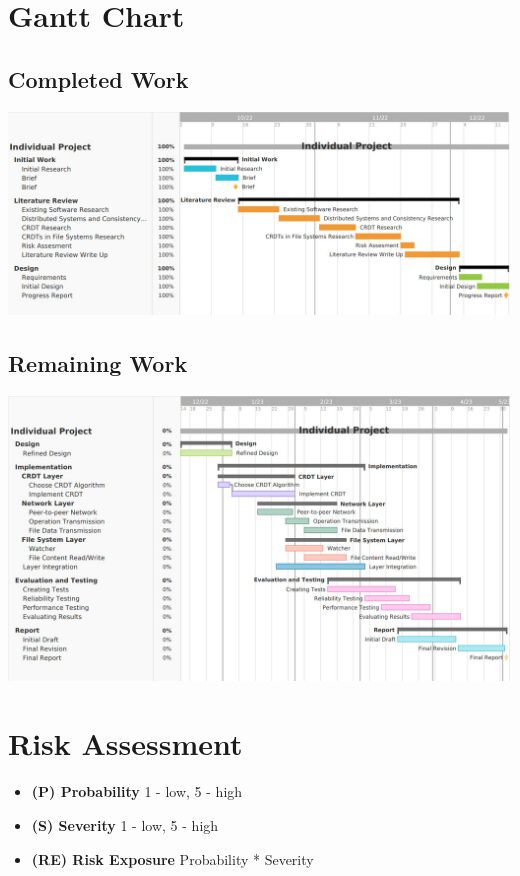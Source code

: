 \documentclass[12pt]{report}
\begin{document}
\section{Gantt Chart}

\subsection{Completed Work}
\includegraphics[width=16cm]{images/completed.jpg}


\subsection{Remaining Work}
\begin{center}
    \includegraphics[width=16cm]{images/remaining.jpg}
\end{center} 


\section{Risk Assessment}

\begin{itemize}
    \item \textbf{(P) Probability} 1 - low, 5 - high
    \item \textbf{(S) Severity}  1 - low, 5 - high
    \item \textbf{(RE) Risk Exposure} Probability * Severity
\end{itemize}
\end{document}
